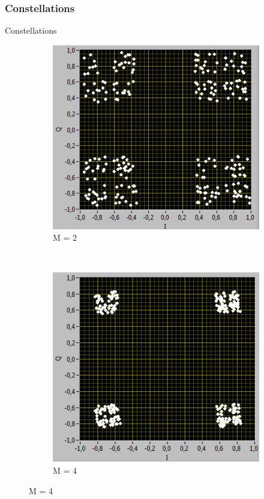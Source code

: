 \documentclass{beamer}
\begin{document}
	\subsubsection{Constellations}
	    \begin{frame}{Constellations}
	        \begin{figure}[h!]
	            \centering  
	            \begin{subfigure}[b]{0.3 \textwidth}
	                \includegraphics[width=\textwidth]{dir_2.PNG}
	                \caption{M = 2}\label{fig:2}
	            \end{subfigure}
	            ~	           
	            \begin{subfigure}[b]{0.3 \textwidth}
	           \includegraphics[width=\textwidth]{dir_4.PNG}
	                \caption{M = 4}\label{fig:4}
	            \end{subfigure}
	            

\end{figure}
\end{frame}
\end{document}
